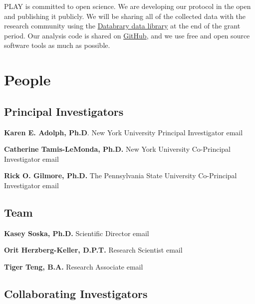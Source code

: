 \documentclass[
]{book}
\begin{document}
PLAY is committed to open science. We are developing our protocol in the open and publishing it publicly. We will be sharing all of the collected data with the research community using the \href{https://databrary.org}{Databrary data library} at the end of the grant period. Our analysis code is shared on \href{https://github.com/PLAY-behaviorome}{GitHub}, and we use free and open source software tools as much as possible.

\hypertarget{people}{%
\section{People}\label{people}}

\hypertarget{pis}{%
\subsection{Principal Investigators}\label{pis}}

\textbf{Karen E. Adolph, Ph.D}.
New York University
Principal Investigator
email

\textbf{Catherine Tamis-LeMonda, Ph.D.}
New York University
Co-Principal Investigator
email

\textbf{Rick O. Gilmore, Ph.D.}
The Pennsylvania State University
Co-Principal Investigator
email

\hypertarget{staff}{%
\subsection{Team}\label{staff}}

\textbf{Kasey Soska, Ph.D.}
Scientific Director
email

\textbf{Orit Herzberg-Keller, D.P.T.}
Research Scientist
email

\textbf{Tiger Teng, B.A.}
Research Associate
email

\hypertarget{collaborators}{%
\subsection{Collaborating Investigators}\label{collaborators}}
\end{document}
